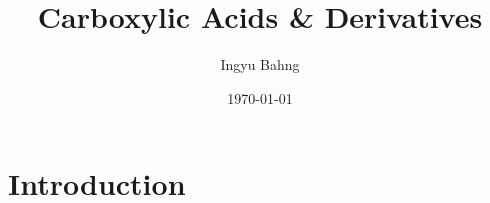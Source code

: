 \documentclass[10pt]{article}
\title{Carboxylic Acids \& Derivatives}
\date{\today}
\author{Ingyu Bahng}
\begin{document}


\section{Introduction}
\end{document}
